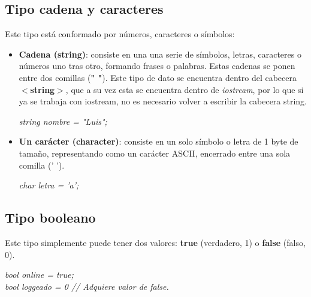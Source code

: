 \subsection{Tipo cadena y caracteres}
\hspace{0.55cm}Este tipo está conformado por números, caracteres o símbolos:
\begin{itemize}
    \item \textbf{Cadena (string)}: consiste en una una serie de símbolos, letras, caracteres o números uno tras otro, formando frases o palabras. Estas cadenas se ponen entre dos comillas (\textbf{" "}). Este tipo de dato se encuentra dentro del cabecera \textbf{$<$string$>$}, que a su vez esta se encuentra dentro de \textit{iostream}, por lo que si ya se trabaja con iostream, no es necesario volver a escribir la cabecera string.
    \begin{center}
		\textit{string nombre = "Luis";}
	\end{center}
    \item \textbf{Un carácter (character)}: consiste en un solo símbolo o letra de 1 byte de tamaño, representando como un carácter ASCII, encerrado entre una sola comilla (' ').
    \begin{center}
		\textit{char letra = 'a';}
	\end{center}
\end{itemize}


\subsection{Tipo booleano}
\hspace{0.55cm}Este tipo simplemente puede tener dos valores: \textbf{true} (verdadero, 1) o \textbf{false} (falso, 0).
\begin{center}
    \textit{
		bool online = true; \\
		bool loggeado = 0 // Adquiere valor de false.
	}
\end{center}



